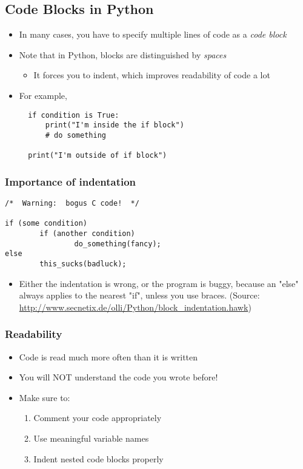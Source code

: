 \documentclass[10pt,article]{article}
\begin{document}
\subsection{Code Blocks in Python}
\label{sec:orgad1e7f4}
\begin{itemize}
\item In many cases, you have to specify multiple lines of code as a \emph{code block}
\item Note that in Python, blocks are distinguished by \emph{spaces}

\begin{itemize}
\item It forces you to indent, which improves readability of code a lot
\end{itemize}

\item For example,

\begin{verbatim}
  if condition is True:
      print("I'm inside the if block")
      # do something
  
  print("I'm outside of if block")
\end{verbatim}
\end{itemize}
\subsubsection{Importance of indentation}
\label{sec:org97719b9}
\begin{verbatim}
/*  Warning:  bogus C code!  */

if (some condition)
        if (another condition)
                do_something(fancy);
else
        this_sucks(badluck);
\end{verbatim}

\begin{itemize}
\item Either the indentation is wrong, or the program is buggy, because an "else" always applies to the nearest "if", unless you use braces. (Source: \url{http://www.secnetix.de/olli/Python/block\_indentation.hawk})
\end{itemize}
\subsubsection{Readability}
\label{sec:org7ccc5d1}
\begin{itemize}
\item Code is read much more often than it is written
\item You will NOT understand the code you wrote before!

\item Make sure to:

\begin{enumerate}
\item Comment your code appropriately
\item Use meaningful variable names
\item Indent nested code blocks properly
\end{enumerate}
\end{itemize}
\end{document}
